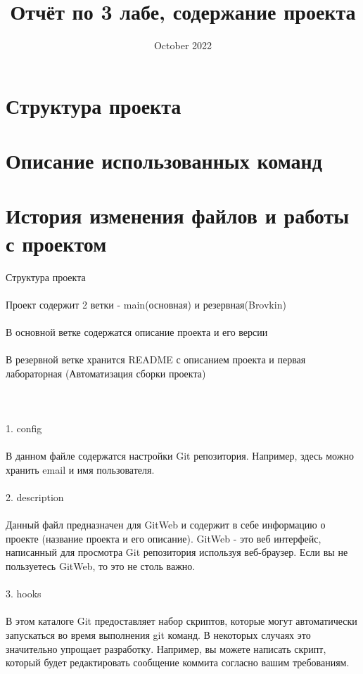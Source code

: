\documentclass{article}
\title{Отчёт по 3 лабе, содержание проекта}
\date{October 2022}
\begin{document}
\maketitle

\section{Структура проекта}
\section{Описание использованных команд}
\section{История изменения файлов и работы с проектом}

\newpage
\huge {Структура проекта} \\ \\
\large{Проект содержит 2 ветки - main(основная) и резервная(Brovkin)}
\\ \\
\large{В основной ветке содержатся описание проекта и его версии}
\\ \\
\large{В резервной ветке хранится README с описанием проекта и первая лабораторная (Автоматизация сборки проекта)}
\\ \\ \\ \\
1. config
\\ \\
В данном файле содержатся настройки Git репозитория. Например, здесь можно хранить email и имя пользователя.
\\ \\
2. description
\\ \\
Данный файл предназначен для GitWeb и содержит в себе информацию о проекте (название проекта и его описание). GitWeb - это веб интерфейс, написанный для просмотра Git репозитория используя веб-браузер. Если вы не пользуетесь GitWeb, то это не столь важно.
\\ \\
3. hooks
\\ \\
В этом каталоге Git предоставляет набор скриптов, которые могут автоматически запускаться во время выполнения git команд. В некоторых случаях это значительно упрощает разработку. Например, вы можете написать скрипт, который будет редактировать сообщение коммита согласно вашим требованиям.
\end{document}
